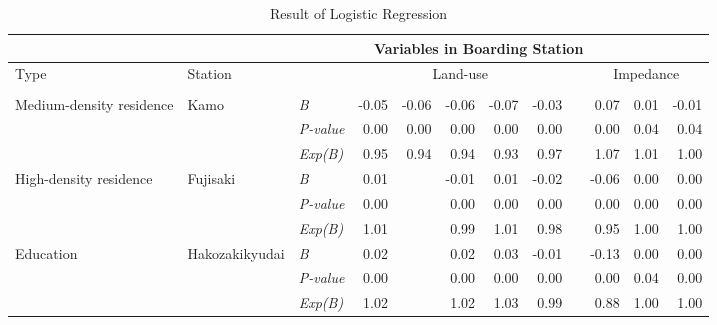 \documentclass[utf8]{article}
\begin{document}
\begin{table}
	\scriptsize %
	\centering
	\caption{Result of Logistic Regression}
	\label{tab:ResultLogisticRegression}
	\begin{tabular}{p{7em}p{5em}p{5em}<{\centering}rrrrrrrrr}
		\Xhline{1.5pt}
		
		\multicolumn{2}{c}{Destination Station} & & \multicolumn{9}{c}{Variables in Boarding Station} \\
		\midrule
		
		\multirow{2}[5]{7em}{Type} & \multirow{2}[5]{5em}{Station} & \multirow{2}[5]{5em}{\centering{Statistical index}} & \multicolumn{5}{c}{Land-use} & & \multicolumn{3}{c}{Impedance} \\
		\cmidrule{4-8} \cmidrule{10-12}
		
		& & & 
		\multicolumn{1}{p{5em}}{\centering{Commerce}} & 
		\multicolumn{1}{p{5em}}{\centering{Office}} & 
		\multicolumn{1}{p{5em}}{\centering{Residence}} & 
		\multicolumn{1}{p{5em}}{\centering{Education}} & 
		\multicolumn{1}{p{5em}}{\centering{Land-use Aggregation}} & &  \multicolumn{1}{p{5em}}{\centering{Operation Distance}} & 
		\multicolumn{1}{p{5em}}{\centering{Bus Capacity}} & 
		\multicolumn{1}{p{5em}}{\centering{Bus Accessibility}} \\
		\midrule
		
		\multirow{3}[0]{7em}{Medium-density residence} & \multirow{3}[0]{5em}{Kamo} & \textsl{B} & -0.05 & -0.06 & -0.06 & -0.07 & -0.03 & & 0.07 & 0.01 & -0.01 \\
		& & \textsl{P-value} & 0.00 & 0.00 & 0.00 & 0.00 & 0.00 & & 0.00 & 0.04 & 0.04 \\
		& & \textsl{Exp(B)} & 0.95 & 0.94 & 0.94 & 0.93 & 0.97 & & 1.07 & 1.01 & 1.00 \\
		\midrule
		
		\multirow{3}[0]{7em}{High-density residence} & \multirow{3}[0]{5em}{Fujisaki} & \textsl{B} & 0.01 & & -0.01 & 0.01 & -0.02 & & -0.06 & 0.00 & 0.00 \\
		& & \textsl{P-value} & 0.00 & & 0.00 & 0.00 & 0.00 & & 0.00 & 0.00 & 0.00 \\
		& & \textsl{Exp(B)} & 1.01 & & 0.99 & 1.01 & 0.98 & & 0.95 & 1.00 & 1.00 \\
		\midrule
		
		\multirow{3}[0]{7em}{Education} & \multirow{3}[0]{5em}{Hakozakikyudai} & \textsl{B} & 0.02 & & 0.02 & 0.03 & -0.01 & & -0.13 & 0.00 & 0.00 \\
		& & \textsl{P-value} & 0.00 & & 0.00 & 0.00 & 0.00 & & 0.00 & 0.04 & 0.00 \\
		& & \textsl{Exp(B)} & 1.02 & & 1.02 & 1.03 & 0.99 & & 0.88 & 1.00 & 1.00 \\
		\midrule
		

\end{tabular}
\end{table}
\end{document}

